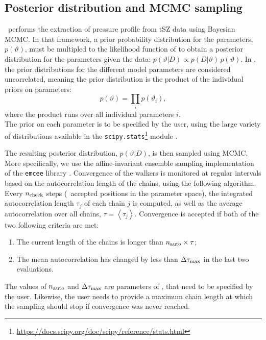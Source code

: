 \subsection{Posterior distribution and MCMC sampling} \label{sec:algo:mcmc}

\panco\ performs the extraction of pressure profile from tSZ data using Bayesian MCMC.
In that framework, a prior probability distribution for the parameters, $p(\vartheta)$, must be multipled to the likelihood function of  to obtain a posterior distribution for the parameters given the data: $p(\vartheta | D) \propto p(D | \vartheta) \, p(\vartheta)$.
In \panco, the prior distributions for the different model parameters are considered uncorrelated, meaning the prior distribution is the product of the individual priors on parameters:
\begin{equation}
    \label{}
    p(\vartheta) = \prod_i p(\vartheta_i),
\end{equation}
where the product runs over all individual parameters $i$. \\
The prior on each parameter is to be specified by the user, using the large variety of distributions available in the \texttt{scipy.stats}\footnote{\url{https://docs.scipy.org/doc/scipy/reference/stats.html}} module \citep{virtanen_scipy_2020}.

The resulting posterior distribution, $p(\vartheta | D)$, is then sampled using MCMC.
More specifically, we use the affine-invariant ensemble sampling implementation of the \texttt{emcee} library \cite{foreman-mackey_emcee_2019}.
Convergence of the walkers is monitored at regular intervals based on the autocorrelation length of the chains, using the following algorithm.
Every $n_{\rm check}$ steps (\ie\ accepted positions in the parameter space), the integrated autocorrelation length $\tau_j$ of each chain $j$ is computed, as well as the average autocorrelation over all chains, $\tau = \left< \tau_j \right>$.
Convergence is accepted if both of the two following criteria are met:
\begin{enumerate}[leftmargin=*]
    \item The current length of the chains is longer than $n_{\rm auto} \times \tau$;
    \item The mean autocorrelation has changed by less than $\Delta\tau_{\rm max}$ in the last two evaluations.
\end{enumerate}
The values of $n_{\rm auto}$ and $\Delta\tau_{\rm max}$ are parameters of \panco, that need to be specified by the user.
Likewise, the user needs to provide a maximum chain length at which the sampling should stop if convergence was never reached.

